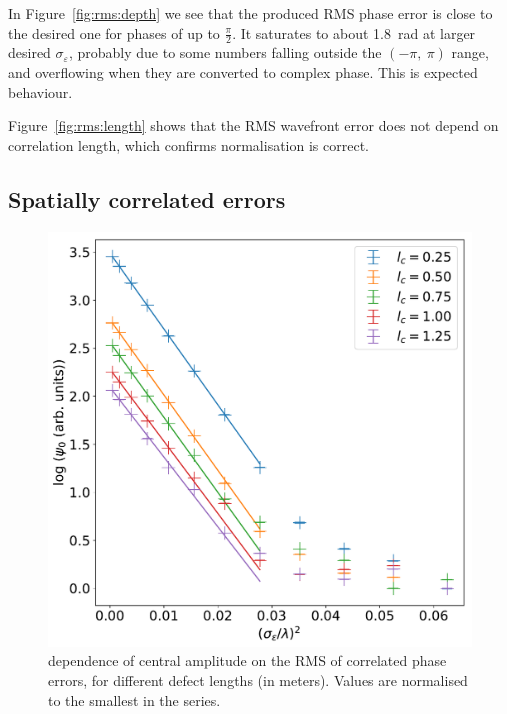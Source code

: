 \documentclass{article}
\newcommand{\eps}{\varepsilon}
\begin{document}
In Figure~\ref{fig:rms:depth} we see that the produced RMS phase error is close to the desired one for phases of up to $\frac{\pi}{2}$. It saturates to about \SI{1.8}{\radian} at larger desired $\sigma_\eps$, probably due to some numbers falling outside the $(-\pi,\ \pi)$ range, and overflowing when they are converted to complex phase. This is expected behaviour.

Figure~\ref{fig:rms:length} shows that the RMS wavefront error does not depend on correlation length, which confirms normalisation is correct.

\subsection{Spatially correlated errors}\label{sec:res:corr}
\begin{figure}
    \centering
    \begin{minipage}{0.48\textwidth}
        \centering
        \includegraphics[width=\textwidth]{pictures/corr/amp.pdf}
        \caption{dependence of central amplitude on the RMS of correlated phase errors, for different defect lengths (in meters). Values are normalised to the smallest in the series.}\label{fig:corr:amps}
    \end{minipage}\hfill
    \begin{minipage}{0.48\textwidth}
        \centering

\end{minipage}
\end{figure}
\end{document}

